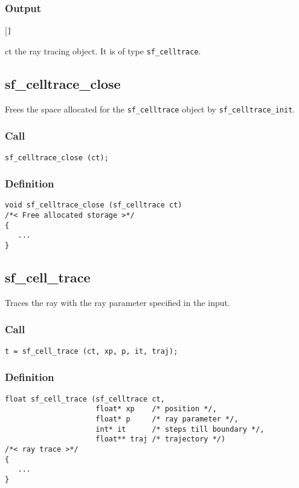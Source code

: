 \subsubsection*{Output}
\begin{desclist}{\tt }{\quad}[\tt ]
   \setlength\itemsep{0pt}
   \item[ct] the ray tracing object. It is of type \texttt{sf\_celltrace}.
\end{desclist}




\subsection{{sf\_celltrace\_close}}
Frees the space allocated for the \texttt{sf\_celltrace} object by \texttt{sf\_celltrace\_init}.

\subsubsection*{Call}
\begin{verbatim}sf_celltrace_close (ct);\end{verbatim}

\subsubsection*{Definition}
\begin{verbatim}
void sf_celltrace_close (sf_celltrace ct)
/*< Free allocated storage >*/
{
   ...
}
\end{verbatim}




\subsection{{sf\_cell\_trace}}
Traces the ray with the ray parameter specified in the input.

\subsubsection*{Call}
\begin{verbatim}t = sf_cell_trace (ct, xp, p, it, traj);\end{verbatim}

\subsubsection*{Definition}
\begin{verbatim}
float sf_cell_trace (sf_celltrace ct, 
                     float* xp    /* position */, 
                     float* p     /* ray parameter */, 
                     int* it      /* steps till boundary */, 
                     float** traj /* trajectory */)
/*< ray trace >*/
{
   ...
}
\end{verbatim}

